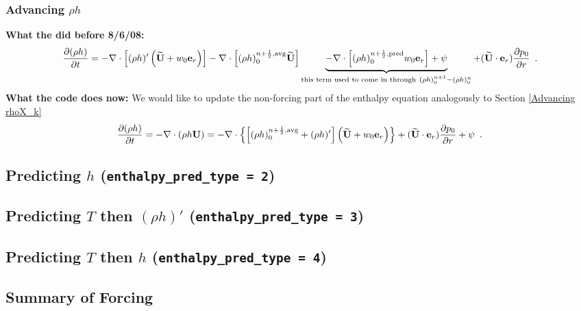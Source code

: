 \subsubsection{Advancing $\rho h$}
{\bf What the did before 8/6/08:}
\begin{equation}
\frac{\partial(\rho h)}{\partial t} = -\nabla\cdot\left[(\rho h)'\left(\widetilde{{\bf U}} 
+ w_0{\bf e}_r\right)\right] - \nabla\cdot\left[(\rho h)_0^{n+\frac{1}{2},{\rm avg}}\widetilde{{\bf U}}\right] 
\underbrace{- \nabla\cdot\left[(\rho h)_0^{n+\frac{1}{2},{\rm pred}}w_0{\bf e}_r\right] + \psi}_{\text{this term used to come in through} ~ (\rho h)_0^{n+1} - (\rho h)_0^n} + (\widetilde{{\bf U}} \cdot \mathbf{e}_r)\frac{\partial p_0}{\partial r} \enskip .
\end{equation}
{\bf What the code does now:} We would like to update the non-forcing
part of the enthalpy equation analogously to Section \ref{Advancing
rhoX_k}
\begin{equation}
\frac{\partial(\rho h)}{\partial t} = -\nabla\cdot(\rho h{\bf U}) = 
-\nabla\cdot\left\{\left[(\rho h)_0^{n+\frac{1}{2},{\rm avg}} 
+ (\rho h)'\right]\left(\widetilde{{\bf U}} + w_0{\bf e}_r\right)\right\} + (\widetilde{{\bf U}} \cdot \mathbf{e}_r)\frac{\partial p_0}{\partial r} + \psi  \enskip .
\end{equation}


\subsection{Predicting $h$ ({\tt enthalpy\_pred\_type = 2})}

\subsection{Predicting $T$ then $(\rho h)'$ ({\tt enthalpy\_pred\_type = 3})}

\subsection{Predicting $T$ then $h$ ({\tt enthalpy\_pred\_type = 4})}

\subsection{Summary of Forcing}

